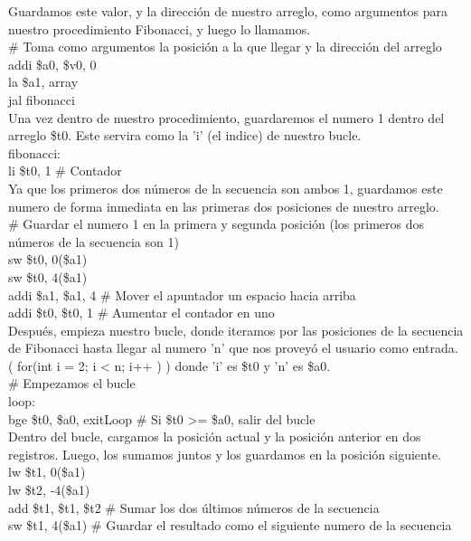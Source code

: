 \documentclass[titlepage]{article}
\begin{document}
Guardamos este valor, y la dirección de nuestro arreglo, como argumentos para nuestro procedimiento Fibonacci, y luego lo llamamos.\\

\noindent \# Toma como argumentos la posición a la que llegar y la dirección del arreglo\\
	addi \$a0, \$v0, 0\\
	la \$a1, array\\
	jal fibonacci\\

Una vez dentro de nuestro procedimiento, guardaremos el numero 1 dentro del arreglo \$t0. Este servira como la 'i' (el indice) de nuestro bucle.\\

\noindent fibonacci:\\
	li \$t0, 1 \# Contador\\

Ya que los primeros dos números de la secuencia son ambos 1, guardamos este numero de forma inmediata en las primeras dos posiciones de nuestro arreglo.\\
	
\noindent \# Guardar el numero 1 en la primera y segunda posición (los primeros dos números de la secuencia son 1)\\
	sw \$t0, 0(\$a1)\\
	sw \$t0, 4(\$a1)\\
	addi \$a1, \$a1, 4 \# Mover el apuntador un espacio hacia arriba\\
	addi \$t0, \$t0, 1 \# Aumentar el contador en uno\\

Después, empieza nuestro bucle, donde iteramos por las posiciones de la secuencia de Fibonacci hasta llegar al numero 'n' que nos proveyó el usuario como entrada. ( for(int i = 2; i < n; i++ ) ) donde 'i' es \$t0 y 'n' es \$a0.\\

\noindent \# Empezamos el bucle\\
	loop:\\
		bge \$t0, \$a0, exitLoop \# Si \$t0 >= \$a0, salir del bucle\\

Dentro del bucle, cargamos la posición actual y la posición anterior en dos registros. Luego, los sumamos juntos y los guardamos en la posición siguiente.\\
        
\noindent lw \$t1, 0(\$a1)\\
		lw \$t2, -4(\$a1)\\
		add \$t1, \$t1, \$t2 \# Sumar los dos últimos números de la secuencia\\
		sw \$t1, 4(\$a1) \# Guardar el resultado como el siguiente numero de la secuencia\\
\end{document}
